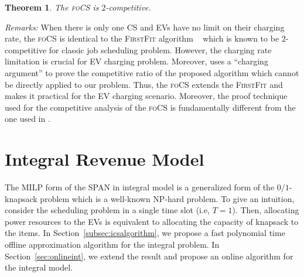 \documentclass[journal]{IEEEtran}
\newcommand{\rev}[1]{{\color{black}#1}}%
\newcommand{\revv}[1]{{\color{black}#1}}%
\newcommand{\rev}[1]{#1}
\newcommand{\MCSP}{\textsf{SPAN}\xspace}
\newcommand{\focs}{\textsc{foCS}\xspace}
\newtheorem{thm}{Theorem}
\begin{document}
\begin{thm}
	\label{thm:focscompetitive}
	The \focs is $2$-competitive.
\end{thm}



\emph{Remarks:} When there is only one CS and EVs have no limit on their charging rate, the \focs is identical to the \textsc{FirstFit} algorithm ~\cite{firstfit} which is known to be $2$-competitive for classic job scheduling problem. However, the charging rate limitation is crucial for EV charging problem. Moreover, \cite{firstfit} uses \revv{a} ``charging argument'' to prove the competitive ratio of the proposed algorithm which cannot be directly applied to our problem. Thus, the \focs extends the \textsc{FirstFit} and makes it practical for the EV charging scenario. Moreover, the proof technique used for the competitive analysis of the \focs is fundamentally different from the one used in \cite{firstfit}. 

%
		\section{Integral Revenue Model}
		\label{sec:integral}
%
		The MILP form of the \MCSP in integral model is a generalized form of the $0/1$-knapsack problem which is a well-known NP-hard problem. \rev{To give an intuition, consider the scheduling problem in a single time slot (i.e, $T=1$). Then, allocating power resources to the EVs is equivalent to allocating the capacity of knapsack to the items. }	
		In Section~\ref{subsec:icsalgorithm}, we propose a fast polynomial time offline approximation algorithm for the integral problem. In Section~\ref{sec:onlineint}, we extend the result and propose an online algorithm for the integral model.
		
\end{document}
